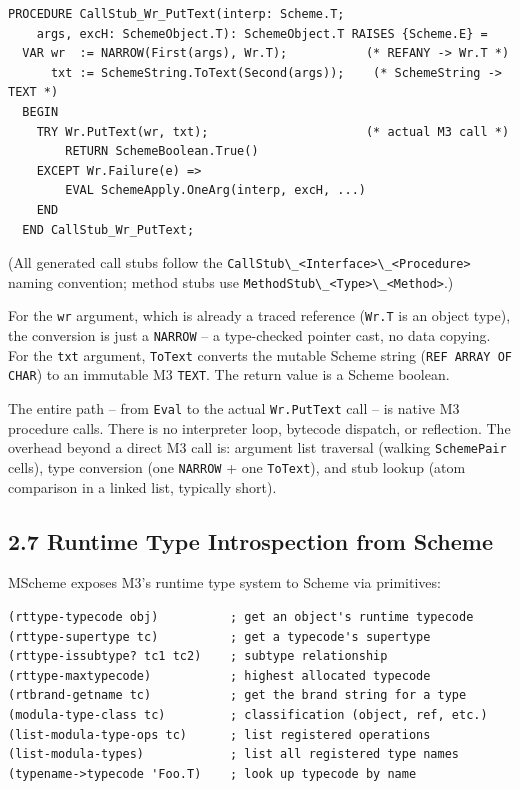 \documentclass[
  12pt,
]{report}
\newcommand{\passthrough}[1]{#1}
\begin{document}
\begin{lstlisting}
PROCEDURE CallStub_Wr_PutText(interp: Scheme.T;
    args, excH: SchemeObject.T): SchemeObject.T RAISES {Scheme.E} =
  VAR wr  := NARROW(First(args), Wr.T);           (* REFANY -> Wr.T *)
      txt := SchemeString.ToText(Second(args));    (* SchemeString -> TEXT *)
  BEGIN
    TRY Wr.PutText(wr, txt);                      (* actual M3 call *)
        RETURN SchemeBoolean.True()
    EXCEPT Wr.Failure(e) =>
        EVAL SchemeApply.OneArg(interp, excH, ...)
    END
  END CallStub_Wr_PutText;
\end{lstlisting}

(All generated call stubs follow the
\passthrough{\lstinline!CallStub\_<Interface>\_<Procedure>!} naming
convention; method stubs use
\passthrough{\lstinline!MethodStub\_<Type>\_<Method>!}.)

For the \passthrough{\lstinline!wr!} argument, which is already a traced
reference (\passthrough{\lstinline!Wr.T!} is an object type), the
conversion is just a \passthrough{\lstinline!NARROW!} -- a type-checked
pointer cast, no data copying. For the \passthrough{\lstinline!txt!}
argument, \passthrough{\lstinline!ToText!} converts the mutable Scheme
string (\passthrough{\lstinline!REF ARRAY OF CHAR!}) to an immutable M3
\passthrough{\lstinline!TEXT!}. The return value is a Scheme boolean.

The entire path -- from \passthrough{\lstinline!Eval!} to the actual
\passthrough{\lstinline!Wr.PutText!} call -- is native M3 procedure
calls. There is no interpreter loop, bytecode dispatch, or reflection.
The overhead beyond a direct M3 call is: argument list traversal
(walking \passthrough{\lstinline!SchemePair!} cells), type conversion
(one \passthrough{\lstinline!NARROW!} + one
\passthrough{\lstinline!ToText!}), and stub lookup (atom comparison in a
linked list, typically short).

\subsection{2.7 Runtime Type Introspection from
Scheme}\label{runtime-type-introspection-from-scheme}

MScheme exposes M3's runtime type system to Scheme via primitives:

\begin{lstlisting}
(rttype-typecode obj)          ; get an object's runtime typecode
(rttype-supertype tc)          ; get a typecode's supertype
(rttype-issubtype? tc1 tc2)    ; subtype relationship
(rttype-maxtypecode)           ; highest allocated typecode
(rtbrand-getname tc)           ; get the brand string for a type
(modula-type-class tc)         ; classification (object, ref, etc.)
(list-modula-type-ops tc)      ; list registered operations
(list-modula-types)            ; list all registered type names
(typename->typecode 'Foo.T)    ; look up typecode by name
\end{lstlisting}
\end{document}
